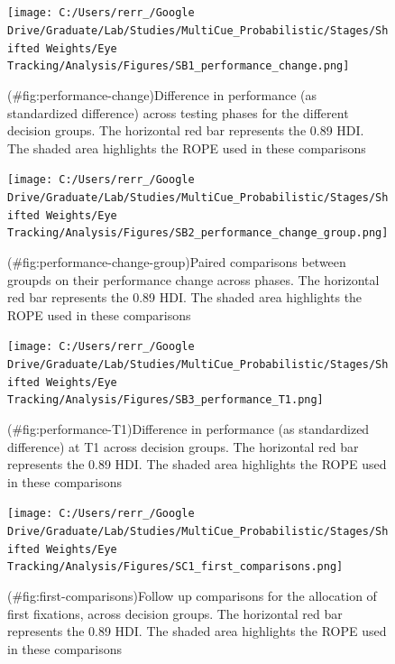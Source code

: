\clearpage
\makeatletter
\efloat@restorefloats
\makeatother


\begin{appendix}
\section{}
\renewcommand{\appendixname}{Supplementary Materials}
\renewcommand{\thefigure}{S\arabic{figure}} \setcounter{figure}{0}
\renewcommand{\thetable}{S\arabic{table}} \setcounter{table}{0}
\renewcommand{\theequation}{S\arabic{table}} \setcounter{equation}{0}
\graphicspath{{"../Documents/Tables and Figures/"}}

\begin{figure}
\centering
\texttt{[image: C:/Users/rerr\_/Google Drive/Graduate/Lab/Studies/MultiCue\_Probabilistic/Stages/Shifted Weights/Eye Tracking/Analysis/Figures/SB1\_performance\_change.png]}
\caption{(\#fig:performance-change)Difference in performance (as
standardized difference) across testing phases for the different
decision groups. The horizontal red bar represents the 0.89 HDI. The
shaded area highlights the ROPE used in these comparisons}
\end{figure}

\begin{figure}
\centering
\texttt{[image: C:/Users/rerr\_/Google Drive/Graduate/Lab/Studies/MultiCue\_Probabilistic/Stages/Shifted Weights/Eye Tracking/Analysis/Figures/SB2\_performance\_change\_group.png]}
\caption{(\#fig:performance-change-group)Paired comparisons between
groupds on their performance change across phases. The horizontal red
bar represents the 0.89 HDI. The shaded area highlights the ROPE used in
these comparisons}
\end{figure}

\begin{figure}
\centering
\texttt{[image: C:/Users/rerr\_/Google Drive/Graduate/Lab/Studies/MultiCue\_Probabilistic/Stages/Shifted Weights/Eye Tracking/Analysis/Figures/SB3\_performance\_T1.png]}
\caption{(\#fig:performance-T1)Difference in performance (as
standardized difference) at T1 across decision groups. The horizontal
red bar represents the 0.89 HDI. The shaded area highlights the ROPE
used in these comparisons}
\end{figure}

\begin{figure}
\centering
\texttt{[image: C:/Users/rerr\_/Google Drive/Graduate/Lab/Studies/MultiCue\_Probabilistic/Stages/Shifted Weights/Eye Tracking/Analysis/Figures/SC1\_first\_comparisons.png]}
\caption{(\#fig:first-comparisons)Follow up comparisons for the
allocation of first fixations, across decision groups. The horizontal
red bar represents the 0.89 HDI. The shaded area highlights the ROPE
used in these comparisons}
\end{figure}


\end{appendix}
